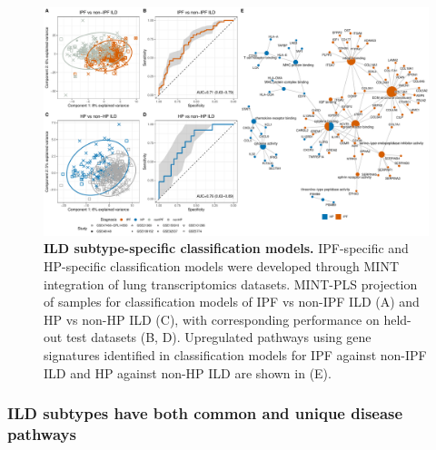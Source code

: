 \documentclass[
]{article}
\begin{document}
\begin{figure}

{\centering \includegraphics[width=0.95\linewidth,]{./Figures/SysReview/Figure4_ILDvsILD} 

}

\caption[ILD vs ILD]{\textbf{ILD subtype-specific classification models.} IPF-specific and HP-specific classification models were developed through MINT integration of lung transcriptomics datasets. MINT-PLS projection of samples for classification models of IPF vs non-IPF ILD (A) and HP vs non-HP ILD (C), with corresponding performance on held-out test datasets (B, D). Upregulated pathways using gene signatures identified in classification models for IPF against non-IPF ILD and HP against non-HP ILD are shown in (E).}\label{fig:ILDvILD}
\end{figure}

\hypertarget{ild-subtypes-have-both-common-and-unique-disease-pathways}{%
\subsubsection{ILD subtypes have both common and unique disease pathways}\label{ild-subtypes-have-both-common-and-unique-disease-pathways}}
\end{document}
